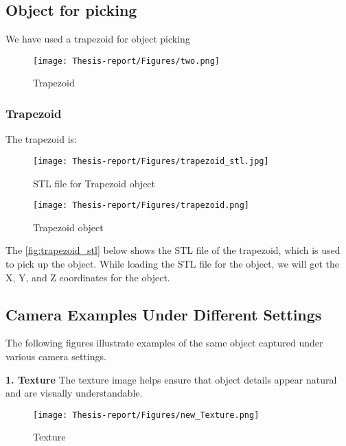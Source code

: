 \documentclass[12pt]{article}
\begin{document}
\newpage
\subsection{Object for picking}
We have used a trapezoid for object picking 

\begin{figure}[h]
    \centering
    \texttt{[image: Thesis-report/Figures/two.png]} 
    \caption{Trapezoid}
    \label{fig1:two}
\end{figure}

\subsubsection{Trapezoid}
The trapezoid  is:\\
\begin{figure}
\centering
\begin{minipage}{0.58\textwidth} %
    \centering
    \texttt{[image: Thesis-report/Figures/trapezoid\_stl.jpg]} 
    \caption{STL file for Trapezoid object}
    \label{fig:trapezoid_stl}
\end{minipage}
\hfill
\begin{minipage}{0.28\textwidth} %
    \centering
    \texttt{[image: Thesis-report/Figures/trapezoid.png]} \caption{Trapezoid object}
    \label{fig:trapezoid.png}
\end{minipage}
\end{figure}
The \autoref{fig:trapezoid_stl}  below shows the STL file of the trapezoid, which is used to pick up the object. While loading the STL file for the object, we will get the X, Y, and Z coordinates for the object.

\subsection{Camera Examples Under Different Settings}

The following figures illustrate examples of the same object captured under various camera settings.

\noindent\textbf{1. Texture} The texture image helps ensure that object details appear natural and are visually understandable.
\begin{figure}[H]
    \centering
    \texttt{[image: Thesis-report/Figures/new\_Texture.png]}
    \caption{Texture}
    \label{fig:texture}
\end{figure}
\end{document}
